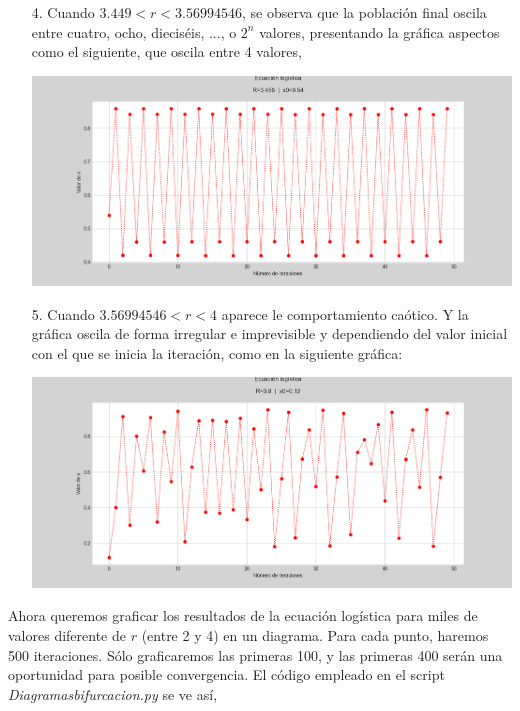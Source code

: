 \documentclass[10pt,a4paper]{article}
\begin{document}
\begin{itemize}
\item[4.] Cuando $3.449 < r < 3.56994546$, se observa que la población final oscila entre cuatro, ocho, dieciséis, ..., o $2^n$ valores, presentando la gráfica aspectos como el siguiente, que oscila entre 4 valores,

\includegraphics[scale=0.5]{Graf_4.png} 

\item[5.] Cuando $3.56994546 < r < 4$ aparece le comportamiento caótico. Y la gráfica oscila de forma irregular e imprevisible y dependiendo del valor inicial con el que se inicia la iteración, como en la siguiente gráfica:

\includegraphics[scale=0.5]{Graf_5.png} 

\end{itemize}

Ahora queremos graficar los resultados de la ecuación logística para miles de valores diferente de $r$ (entre 2 y 4) en un diagrama. Para cada punto, haremos 500 iteraciones. Sólo graficaremos las primeras 100, y las primeras 400 serán una oportunidad para posible convergencia. El código empleado en el script  \textit{Diagramasbifurcacion.py} se ve así,
\end{document}
